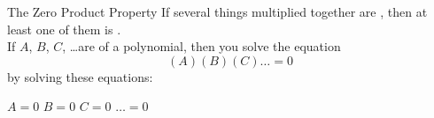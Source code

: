 


\begin{myConcept}{The Zero Product Property}
    If several things multiplied together are , 
    then at least one of them is .\\[2\baselineskip]
    If $A$, $B$, $C$, \dots are  of a polynomial,
    then you solve the equation 
    \[(A)(B)(C)\dots=0\]
    by solving these  equations:
    \begin{center}
        \hfill
        $A=0$
        \hfill
        $B=0$ 
        \hfill
        $C=0$ 
        \hfill 
        $\dots=0$
        \hfill{\,}
    \end{center}
\end{myConcept}
